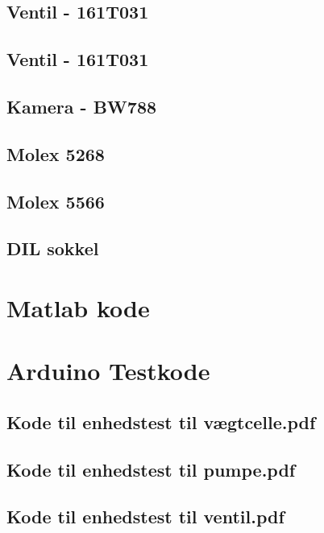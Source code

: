 \subsection{Ventil - 161T031}
\label{bilag:ventil}

\subsection{Ventil - 161T031}
\label{bilag:ventil}

\subsection{Kamera - BW788}

\subsection{Molex 5268}

\subsection{Molex 5566}


\subsection{DIL sokkel}

\section{Matlab kode}
\label{bilag:matlab}
\newpage
\section{Arduino Testkode}

\subsection{Kode til enhedstest til vægtcelle.pdf} 
\label{bilag:TKloadcell}


\subsection{Kode til enhedstest til pumpe.pdf}
\label{bilag:TKpumpe}

\subsection{Kode til enhedstest til ventil.pdf}
\label{bilag:TKventil}

